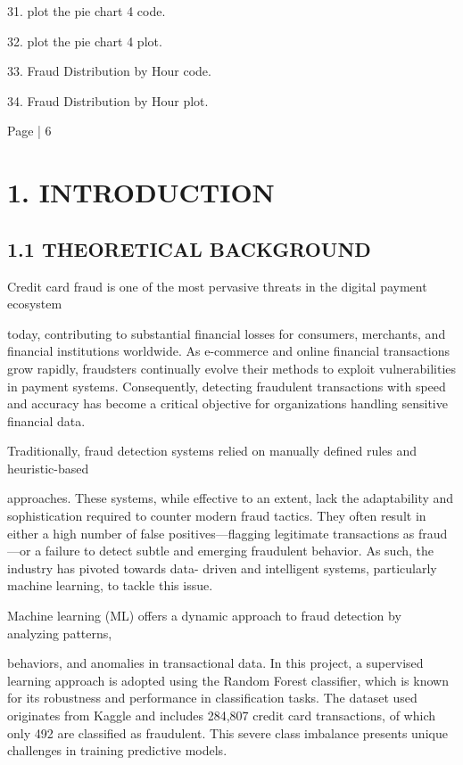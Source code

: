 \documentclass[11pt,a4paper]{article}
\begin{document}
31. plot the pie chart 4 code. 

32. plot the pie chart 4 plot. 

33. Fraud Distribution by Hour code. 

34. Fraud Distribution by Hour plot. 

Page | 6  

\newpage

\section*{1. INTRODUCTION }

\subsection*{1.1 THEORETICAL BACKGROUND }

         Credit card fraud is one of the most pervasive threats in the digital payment ecosystem 

today, contributing to substantial financial losses for consumers, merchants, and financial 
institutions worldwide. As e-commerce and online financial transactions grow rapidly, 
fraudsters continually evolve their methods to exploit vulnerabilities in payment systems. 
Consequently, detecting fraudulent transactions with speed and accuracy has become a 
critical objective for organizations handling sensitive financial data. 

         Traditionally, fraud detection systems relied on manually defined rules and heuristic-based 

approaches. These systems, while effective to an extent, lack the adaptability and 
sophistication required to counter modern fraud tactics. They often result in either a high 
number of false positives—flagging legitimate transactions as fraud—or a failure to detect 
subtle and emerging fraudulent behavior. As such, the industry has pivoted towards data-
driven and intelligent systems, particularly machine learning, to tackle this issue. 

         Machine learning (ML) offers a dynamic approach to fraud detection by analyzing patterns, 

behaviors, and anomalies in transactional data. In this project, a supervised learning 
approach is adopted using the Random Forest classifier, which is known for its robustness 
and performance in classification tasks. The dataset used originates from Kaggle and 
includes 284,807 credit card transactions, of which only 492 are classified as fraudulent. 
This severe class imbalance presents unique challenges in training predictive models. 
\end{document}
